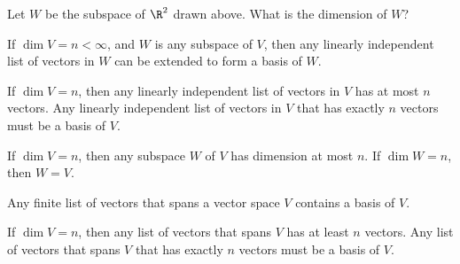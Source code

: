 Let $W$ be the subspace of $\R^2$ drawn above.  What is the dimension of $W$?  




\endedxproblem


\endedxvertical










{}  If $\dim V = n < \infty$, and $W$ is any subspace of $V$, then any
linearly independent list of vectors in $W$ can be extended to form a basis of $W$.  

{} If $\dim V = n$, then any linearly independent list of vectors in $V$ has
at most $n$ vectors.  Any linearly independent list of vectors in $V$ that has exactly $n$ vectors must
be a basis of $V$.  


{} If $\dim V = n$, then any subspace $W$ of $V$ has dimension at most $n$.  
If $\dim W = n$, then $W = V$.  


{} Any finite list of vectors that spans a vector space $V$ contains a basis of $V$.  

{} If $\dim V = n$, then any list of vectors that spans $V$ has
at least $n$ vectors.  Any  list of vectors that spans $V$ that has exactly $n$ vectors must
be a basis of $V$.  


